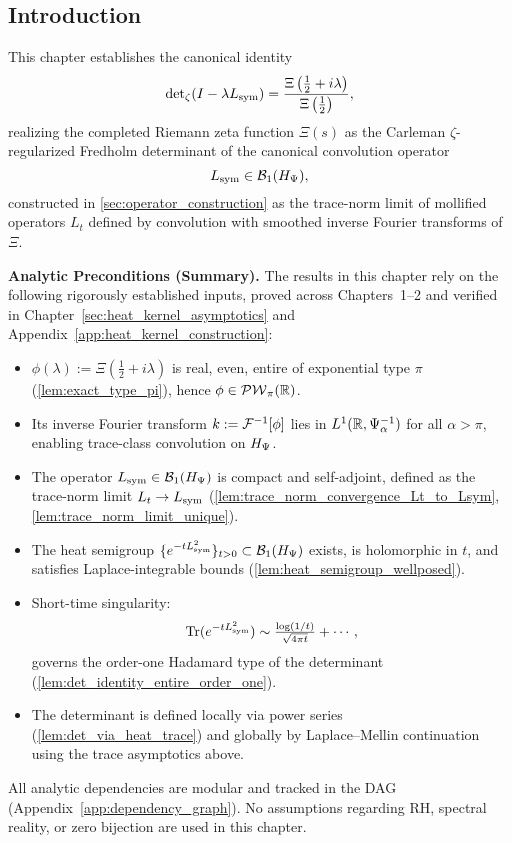 \subsection*{Introduction}
\label{sec:det_intro}

This chapter establishes the canonical identity
\begin{equation}
\label{eq:zeta_det_identity}
\det\nolimits_{\zeta}(I - \lambda L_{\mathrm{sym}}) 
= \frac{\Xi\left( \tfrac{1}{2} + i\lambda \right)}{\Xi\left( \tfrac{1}{2} \right)},
\end{equation}
realizing the completed Riemann zeta function \( \Xi(s) \) as the Carleman \(\zeta\)-regularized Fredholm determinant of the canonical convolution operator
\[
L_{\mathrm{sym}} \in \mathcal{B}_1(H_{\Psi}),
\]
constructed in \cref{sec:operator_construction} as the trace-norm limit of mollified operators \( L_t \) defined by convolution with smoothed inverse Fourier transforms of \( \Xi \).

\begin{previewbox}
\textbf{Analytic Preconditions (Summary).}
The results in this chapter rely on the following rigorously established inputs, proved across Chapters~1–2 and verified in Chapter~\ref{sec:heat_kernel_asymptotics} and Appendix~\ref{app:heat_kernel_construction}:

\begin{itemize}
  \item \( \phi(\lambda) := \Xi(\tfrac{1}{2} + i\lambda) \) is real, even, entire of exponential type \( \pi \) (\cref{lem:exact_type_pi}), hence \( \phi \in \mathcal{PW}_{\pi}(\mathbb{R}) \).
  \item Its inverse Fourier transform \( k := \mathcal{F}^{-1}[\phi] \) lies in \( L^1(\mathbb{R}, \Psi_\alpha^{-1}) \) for all \( \alpha > \pi \), enabling trace-class convolution on \( H_{\Psi} \).
  \item The operator \( L_{\mathrm{sym}} \in \mathcal{B}_1(H_{\Psi}) \) is compact and self-adjoint, defined as the trace-norm limit \( L_t \to L_{\mathrm{sym}} \) (\cref{lem:trace_norm_convergence_Lt_to_Lsym}, \cref{lem:trace_norm_limit_unique}).
  \item The heat semigroup \( \{ e^{-t L_{\mathrm{sym}}^2} \}_{t > 0} \subset \mathcal{B}_1(H_{\Psi}) \) exists, is holomorphic in \( t \), and satisfies Laplace-integrable bounds (\cref{lem:heat_semigroup_wellposed}).
  \item Short-time singularity:
  \[
  \operatorname{Tr}(e^{-t L_{\mathrm{sym}}^2}) \sim \tfrac{\log(1/t)}{\sqrt{4\pi t}} + \cdots,
  \]
  governs the order-one Hadamard type of the determinant (\cref{lem:det_identity_entire_order_one}).
  \item The determinant is defined locally via power series (\cref{lem:det_via_heat_trace}) and globally by Laplace–Mellin continuation using the trace asymptotics above.
\end{itemize}

All analytic dependencies are modular and tracked in the DAG (Appendix~\ref{app:dependency_graph}). No assumptions regarding RH, spectral reality, or zero bijection are used in this chapter.
\end{previewbox}

